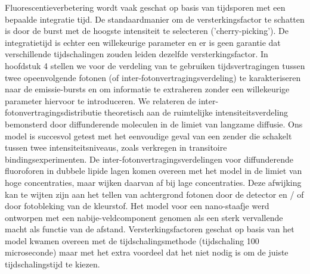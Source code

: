 Fluorescentieverbetering wordt vaak geschat op basis van tijdsporen met een bepaalde
integratie tijd. De standaardmanier om de versterkingsfactor te schatten is door de
burst met de hoogste intensiteit te selecteren ('cherry-picking'). De integratietijd is echter een
willekeurige parameter en er is geen garantie dat verschillende tijdschalingen zouden leiden
dezelfde versterkingsfactor. In hoofdstuk 4 stellen we voor de verdeling van te gebruiken
tijdsvertragingen tussen twee opeenvolgende fotonen (of inter-fotonvertragingsverdeling) te karakteriseren naar de emissie-bursts en om informatie te extraheren zonder een willekeurige parameter hiervoor te introduceren. We relateren de inter-fotonvertragingsdistributie theoretisch aan de ruimtelijke intensiteitsverdeling bemonsterd door diffunderende moleculen in de limiet van langzame diffusie. Ons model is succesvol getest met het eenvoudige geval van een zender die schakelt tussen twee intensiteitsniveaus, zoals verkregen in transitoire bindingsexperimenten. De inter-fotonvertragingsverdelingen voor diffunderende fluoroforen in dubbele lipide lagen komen overeen met het model in de limiet van hoge
concentraties, maar wijken daarvan af bij lage concentraties. Deze afwijking kan te wijten zijn aan het tellen van achtergrond fotonen door de detector en / of door fotobleking van de kleurstof. Het model voor een nano-staafje werd ontworpen met een nabije-veldcomponent genomen als een sterk vervallende macht als functie van de afstand. Versterkingsfactoren geschat op basis van het model kwamen overeen met de tijdschalingsmethode (tijdschaling  100 microseconde) maar met het extra voordeel dat het niet nodig is om de juiste tijdschalingstijd te kiezen.


